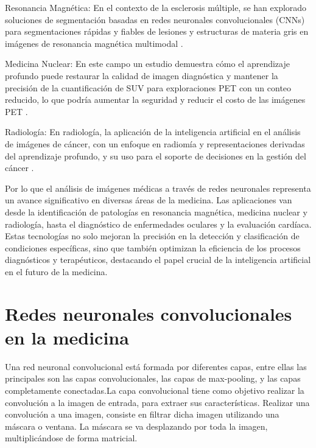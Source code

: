 \begin{description}   
    \item Resonancia Magnética: En el contexto de la esclerosis múltiple, se han explorado soluciones de segmentación basadas en redes neuronales convolucionales (CNNs) para segmentaciones rápidas y fiables de lesiones y estructuras de materia gris en imágenes de resonancia magnética multimodal .
    
    \item Medicina Nuclear:  En este campo un estudio demuestra cómo el aprendizaje profundo puede restaurar la calidad de imagen diagnóstica y mantener la precisión de la cuantificación de SUV para exploraciones PET con un conteo reducido, lo que podría aumentar la seguridad y reducir el costo de las imágenes PET .
    
    \item Radiología: En radiología, la aplicación de la inteligencia artificial en el análisis de imágenes de cáncer, con un enfoque en radiomía y representaciones derivadas del aprendizaje profundo, y su uso para el soporte de decisiones en la gestión del cáncer .
\end{description}

Por lo que el análisis de imágenes médicas a través de redes neuronales representa un avance significativo en diversas áreas de la medicina. Las aplicaciones van desde la identificación de patologías en resonancia magnética, medicina nuclear y radiología, hasta el diagnóstico de enfermedades oculares y la evaluación cardíaca. Estas tecnologías no solo mejoran la precisión en la detección y clasificación de condiciones específicas, sino que también optimizan la eficiencia de los procesos diagnósticos y terapéuticos, destacando el papel crucial de la inteligencia artificial en el futuro de la medicina.

\section{Redes neuronales convolucionales en la medicina}   

Una red neuronal convolucional está formada por diferentes capas, entre ellas las principales son las capas convolucionales, las capas de max-pooling, y las capas completamente conectadas.La capa convolucional tiene como objetivo realizar la convolución a la imagen de entrada, para extraer sus características. Realizar una convolución a una imagen, consiste en filtrar dicha imagen utilizando una máscara o ventana. La máscara se va desplazando por toda la imagen, multiplicándose de forma matricial. 

